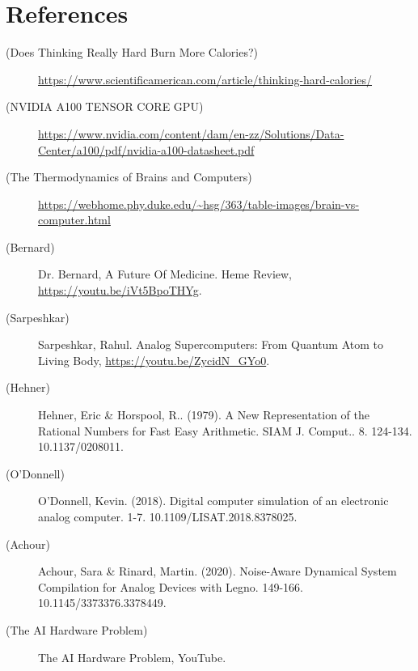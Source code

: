 \newpage
\section*{References}

\newcommand{\sourceEntry}[2]{
\item [({#1})]{#2}
}

\begin{description}
\sourceEntry{Does Thinking Really Hard Burn More Calories?}{\url{https://www.scientificamerican.com/article/thinking-hard-calories/}}
\sourceEntry{NVIDIA A100
TENSOR CORE GPU}{\url{https://www.nvidia.com/content/dam/en-zz/Solutions/Data-Center/a100/pdf/nvidia-a100-datasheet.pdf}}
\sourceEntry{The Thermodynamics of Brains and Computers}{\url{https://webhome.phy.duke.edu/~hsg/363/table-images/brain-vs-computer.html}}
\sourceEntry{Bernard}{Dr. Bernard, A Future Of Medicine. Heme Review, \url{https://youtu.be/iVt5BpoTHYg}.}
\sourceEntry{Sarpeshkar}{Sarpeshkar, Rahul. Analog Supercomputers: From Quantum Atom to Living Body, \url{https://youtu.be/ZycidN_GYo0}.}
\sourceEntry{Hehner}{Hehner, Eric \& Horspool, R.. (1979). A New Representation of the Rational Numbers for Fast Easy Arithmetic. SIAM J. Comput.. 8. 124-134. 10.1137/0208011.}
\sourceEntry{O'Donnell}{O'Donnell, Kevin. (2018). Digital computer simulation of an electronic analog computer. 1-7. 10.1109/LISAT.2018.8378025. }
\sourceEntry{Achour}{Achour, Sara \& Rinard, Martin. (2020). Noise-Aware Dynamical System Compilation for Analog Devices with Legno. 149-166. 10.1145/3373376.3378449.}
\sourceEntry{The AI Hardware Problem}{The AI Hardware Problem, YouTube.}
\end{description}



